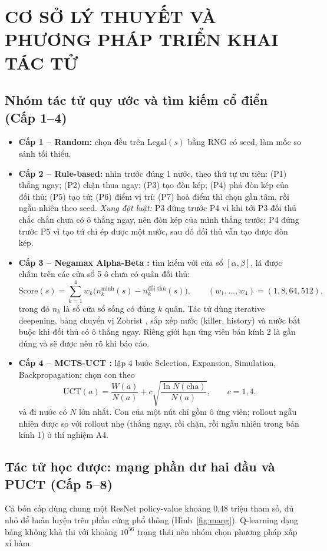 \documentclass[12pt,a4paper]{report}
\newenvironment{gon}{\begin{itemize}\setlength{\itemsep}{2pt}\setlength{\parskip}{0pt}}{\end{itemize}}
\begin{document}
\section{CƠ SỞ LÝ THUYẾT VÀ PHƯƠNG PHÁP TRIỂN KHAI TÁC TỬ}

\subsection{Nhóm tác tử quy ước và tìm kiếm cổ điển (Cấp 1--4)}
\begin{gon}
  \item \textbf{Cấp 1 -- Random:} chọn đều trên $\text{Legal}(s)$ bằng RNG có seed, làm mốc so sánh tối thiểu.
  \item \textbf{Cấp 2 -- Rule-based:} nhìn trước đúng 1 nước, theo thứ tự ưu tiên: (P1) thắng ngay; (P2) chặn thua ngay; (P3) tạo đòn kép; (P4) phá đòn kép của đối thủ; (P5) tạo tứ; (P6) điểm vị trí; (P7) hoà điểm thì chọn gần tâm, rồi ngẫu nhiên theo seed. \textit{Xung đột luật:} P3 đứng trước P4 vì khi tới P3 đối thủ chắc chắn chưa có ô thắng ngay, nên đòn kép của mình thắng trước; P4 đứng trước P5 vì tạo tứ chỉ ép được một nước, sau đó đối thủ vẫn tạo được đòn kép.
  \item \textbf{Cấp 3 -- Negamax Alpha-Beta \cite{knuth1975alphabeta}:} tìm kiếm với cửa sổ $[\alpha, \beta]$, lá được chấm trên các cửa sổ 5 ô chưa có quân đối thủ:
  \[
    \text{Score}(s) = \sum_{k=1}^{4} w_k \big( n_k^{\text{mình}}(s) - n_k^{\text{đối thủ}}(s) \big), \qquad (w_1, \dots, w_4) = (1, 8, 64, 512),
  \]
  trong đó $n_k$ là số cửa sổ sống có đúng $k$ quân. Tác tử dùng iterative deepening, bảng chuyển vị Zobrist \cite{zobrist1970}, sắp xếp nước (killer, history) và nước bắt buộc khi đối thủ có ô thắng ngay. Riêng giới hạn ứng viên bán kính 2 là gần đúng và sẽ được nêu rõ khi báo cáo.
  \item \textbf{Cấp 4 -- MCTS-UCT \cite{kocsis2006uct,browne2012mcts}:} lặp 4 bước Selection, Expansion, Simulation, Backpropagation; chọn con theo
  \[
    \text{UCT}(a) = \frac{W(a)}{N(a)} + c \sqrt{\frac{\ln N(\text{cha})}{N(a)}}, \qquad c = 1{,}4,
  \]
  và đi nước có $N$ lớn nhất. Con của một nút chỉ gồm ô ứng viên; rollout ngẫu nhiên được so với rollout nhẹ (thắng ngay, rồi chặn, rồi ngẫu nhiên trong bán kính 1) ở thí nghiệm A4.
\end{gon}

\subsection{Tác tử học được: mạng phần dư hai đầu và PUCT (Cấp 5--8)}
Cả bốn cấp dùng chung một ResNet policy-value \cite{he2016resnet} khoảng 0,48 triệu tham số, đủ nhỏ để huấn luyện trên phần cứng phổ thông (Hình~\ref{fig:mang}). Q-learning dạng bảng không khả thi với khoảng $10^{56}$ trạng thái nên nhóm chọn phương pháp xấp xỉ hàm.
\end{document}
